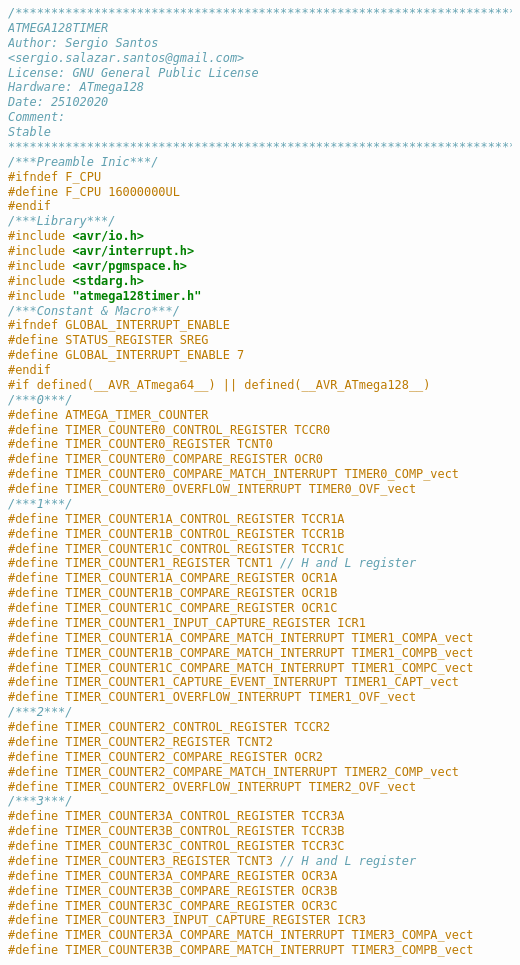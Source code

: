 \begin{lstlisting}[language=C, caption={atmega128timer.c}, label=atmega128timer-c, captionpos=b]
/*************************************************************************
ATMEGA128TIMER
Author: Sergio Santos 
<sergio.salazar.santos@gmail.com>
License: GNU General Public License
Hardware: ATmega128
Date: 25102020
Comment:
Stable
*************************************************************************/
/***Preamble Inic***/
#ifndef F_CPU
#define F_CPU 16000000UL
#endif
/***Library***/
#include <avr/io.h>
#include <avr/interrupt.h>
#include <avr/pgmspace.h>
#include <stdarg.h>
#include "atmega128timer.h"
/***Constant & Macro***/
#ifndef GLOBAL_INTERRUPT_ENABLE
#define STATUS_REGISTER SREG
#define GLOBAL_INTERRUPT_ENABLE 7
#endif
#if defined(__AVR_ATmega64__) || defined(__AVR_ATmega128__)
/***0***/
#define ATMEGA_TIMER_COUNTER
#define TIMER_COUNTER0_CONTROL_REGISTER TCCR0
#define TIMER_COUNTER0_REGISTER TCNT0
#define TIMER_COUNTER0_COMPARE_REGISTER OCR0
#define TIMER_COUNTER0_COMPARE_MATCH_INTERRUPT TIMER0_COMP_vect
#define TIMER_COUNTER0_OVERFLOW_INTERRUPT TIMER0_OVF_vect
/***1***/
#define TIMER_COUNTER1A_CONTROL_REGISTER TCCR1A
#define TIMER_COUNTER1B_CONTROL_REGISTER TCCR1B
#define TIMER_COUNTER1C_CONTROL_REGISTER TCCR1C
#define TIMER_COUNTER1_REGISTER TCNT1 // H and L register
#define TIMER_COUNTER1A_COMPARE_REGISTER OCR1A
#define TIMER_COUNTER1B_COMPARE_REGISTER OCR1B
#define TIMER_COUNTER1C_COMPARE_REGISTER OCR1C
#define TIMER_COUNTER1_INPUT_CAPTURE_REGISTER ICR1
#define TIMER_COUNTER1A_COMPARE_MATCH_INTERRUPT TIMER1_COMPA_vect
#define TIMER_COUNTER1B_COMPARE_MATCH_INTERRUPT TIMER1_COMPB_vect
#define TIMER_COUNTER1C_COMPARE_MATCH_INTERRUPT TIMER1_COMPC_vect
#define TIMER_COUNTER1_CAPTURE_EVENT_INTERRUPT TIMER1_CAPT_vect
#define TIMER_COUNTER1_OVERFLOW_INTERRUPT TIMER1_OVF_vect
/***2***/
#define TIMER_COUNTER2_CONTROL_REGISTER TCCR2
#define TIMER_COUNTER2_REGISTER TCNT2
#define TIMER_COUNTER2_COMPARE_REGISTER OCR2
#define TIMER_COUNTER2_COMPARE_MATCH_INTERRUPT TIMER2_COMP_vect
#define TIMER_COUNTER2_OVERFLOW_INTERRUPT TIMER2_OVF_vect
/***3***/
#define TIMER_COUNTER3A_CONTROL_REGISTER TCCR3A
#define TIMER_COUNTER3B_CONTROL_REGISTER TCCR3B
#define TIMER_COUNTER3C_CONTROL_REGISTER TCCR3C
#define TIMER_COUNTER3_REGISTER TCNT3 // H and L register
#define TIMER_COUNTER3A_COMPARE_REGISTER OCR3A
#define TIMER_COUNTER3B_COMPARE_REGISTER OCR3B
#define TIMER_COUNTER3C_COMPARE_REGISTER OCR3C
#define TIMER_COUNTER3_INPUT_CAPTURE_REGISTER ICR3
#define TIMER_COUNTER3A_COMPARE_MATCH_INTERRUPT TIMER3_COMPA_vect
#define TIMER_COUNTER3B_COMPARE_MATCH_INTERRUPT TIMER3_COMPB_vect

\end{lstlisting}
